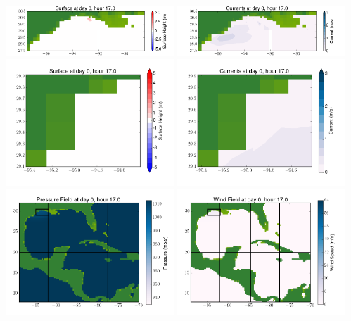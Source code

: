 \documentclass[11pt]{article}
\begin{document}
\includegraphics[width=0.475\textwidth]{frame0089fig4.png}
\vskip 10pt 
\includegraphics[width=0.475\textwidth]{frame0089fig5.png}
\includegraphics[width=0.475\textwidth]{frame0089fig6.png}
\vskip 10pt 
\includegraphics[width=0.475\textwidth]{frame0089fig7.png}
\includegraphics[width=0.475\textwidth]{frame0089fig8.png}
\vskip 10pt 
\includegraphics[width=0.475\textwidth]{frame0089fig9.png}
\end{document}
